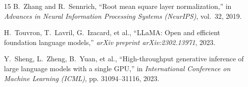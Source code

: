 \documentclass[conference]{IEEEtran}
\begin{document}
\begin{thebibliography}{15}
B.~Zhang and R.~Sennrich, ``Root mean square layer normalization,'' in \emph{Advances in Neural Information Processing Systems (NeurIPS)}, vol.~32, 2019.

H.~Touvron, T.~Lavril, G.~Izacard, et al., ``LLaMA: Open and efficient foundation language models,'' \emph{arXiv preprint arXiv:2302.13971}, 2023.

Y.~Sheng, L.~Zheng, B.~Yuan, et al., ``High-throughput generative inference of large language models with a single GPU,'' in \emph{International Conference on Machine Learning (ICML)}, pp. 31094--31116, 2023.

\end{thebibliography}
\end{document}
